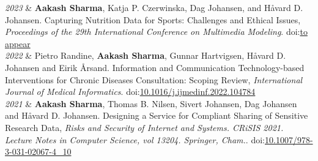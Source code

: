 \documentclass[11pt, a4paper]{article}
\newcommand{\DOI}[1]{doi:\href{https://doi.org/#1}{#1}}
\newcommand{\Year}[1]{\fontsize{10pt}{0}\selectfont #1}
\begin{document}
\begin{EntriesTable}
	
	\Year{\textit{2023}}  &
	\textbf{Aakash Sharma}, Katja P. Czerwinska, Dag Johansen, and H{\aa}vard D. Johansen.
	Capturing Nutrition Data for Sports: Challenges and Ethical Issues,
	\emph{Proceedings of the 29th International Conference on Multimedia Modeling}. 
	\DOI{to appear}
	\\
	
	
	\Year{\textit{2022}}  &
	Pietro Randine, \textbf{Aakash Sharma}, Gunnar Hartvigsen, H{\aa}vard D. Johansen and Eirik {\AA}rsand.
	Information and Communication Technology-based Interventions for Chronic Diseases Consultation: Scoping Review,
	\emph{International Journal of Medical Informatics}. 
	\DOI{10.1016/j.ijmedinf.2022.104784}
	\\
	
	
	\Year{\textit{2021}}  &
	\textbf{Aakash Sharma}, Thomas B. Nilsen, Sivert Johansen, Dag Johansen and H{\aa}vard D. Johansen.
	Designing a Service for Compliant Sharing of Sensitive Research Data,
	\emph{Risks and Security of Internet and Systems. CRiSIS 2021. Lecture Notes in Computer Science, vol 13204. Springer, Cham.}. 
	\DOI{10.1007/978-3-031-02067-4\_10}
	\\
	

\end{EntriesTable}
\end{document}

